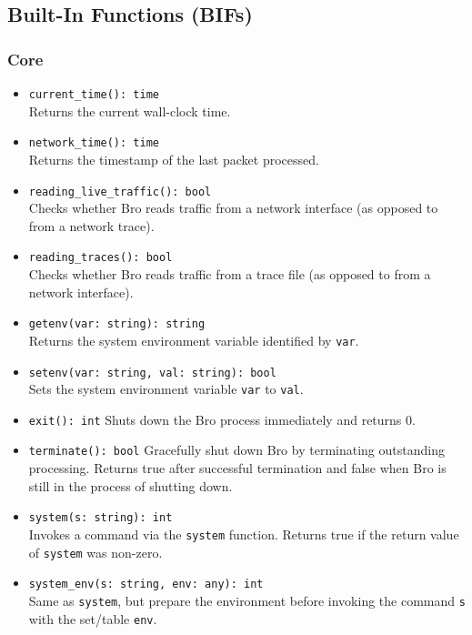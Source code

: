 \documentclass[10pt,landscape]{article}
\begin{document}
\begin{multicols*}{2}
\subsection*{Built-In Functions (BIFs)}
\linespread{0.9}

\subsubsection*{Core}

\begin{itemize}
  \item \verb|current_time(): time|\\
    Returns the current wall-clock time.
  \item \verb|network_time(): time|\\
    Returns the timestamp of the last packet processed.
  \item \verb|reading_live_traffic(): bool|\\
    Checks whether Bro reads traffic from a network interface (as opposed to
    from a network trace).
  \item \verb|reading_traces(): bool|\\
    Checks whether Bro reads traffic from a trace file (as opposed to
    from a network interface).
  \item \verb|getenv(var: string): string|\\
    Returns the system environment variable identified by \texttt{var}.
  \item \verb|setenv(var: string, val: string): bool|\\
    Sets the system environment variable \texttt{var} to \texttt{val}.
  \item \verb|exit(): int|
    Shuts down the Bro process immediately and returns 0.
  \item \verb|terminate(): bool|
    Gracefully shut down Bro by terminating outstanding processing. Returns
    true after successful termination and false when Bro is still in the
    process of shutting down.
  \item \verb|system(s: string): int|\\
    Invokes a command via the \texttt{system} function.
    Returns true if the return value of \texttt{system} was non-zero.
  \item \verb|system_env(s: string, env: any): int|\\
    Same as \verb|system|, but prepare the environment before invoking the
    command \texttt{s} with the set/table \texttt{env}.

\end{itemize}
\end{multicols*}
\end{document}
